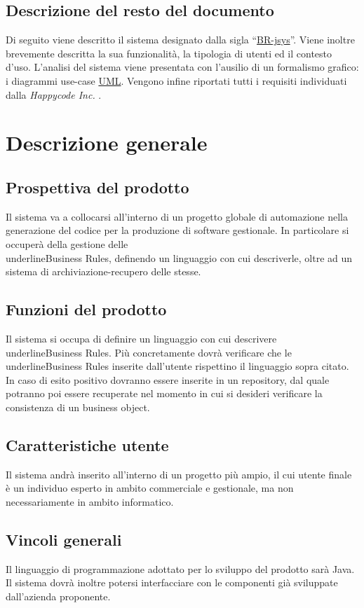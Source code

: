 \section{Descrizione del resto del documento}
Di seguito viene descritto il sistema designato dalla sigla ``\underline{BR-jsys}''. Viene inoltre brevemente descritta la sua funzionalit\`a, la tipologia di utenti ed il contesto d'uso. L'analisi del sistema viene presentata con l'ausilio di un formalismo grafico: i diagrammi use-case \underline{UML}. Vengono infine riportati tutti i requisiti individuati dalla \textit{Happycode Inc.} .

\chapter{Descrizione generale}
\section{Prospettiva del prodotto}
Il sistema va a collocarsi all'interno di un progetto globale di automazione nella generazione del codice per la produzione di software gestionale. In particolare si occuper\`a della gestione delle \\underline{Business Rules}, definendo un linguaggio con cui descriverle, oltre ad un sistema di archiviazione-recupero delle stesse.
\section{Funzioni del prodotto}
Il sistema si occupa di definire un linguaggio con cui descrivere \\underline{Business Rules}. Pi\`u concretamente dovr\`a verificare che le \\underline{Business Rules} inserite dall'utente rispettino il linguaggio sopra citato. In caso di esito positivo dovranno essere inserite in un repository, dal quale potranno poi essere recuperate nel momento in cui si desideri verificare la consistenza di un business object.
\section{Caratteristiche utente}
Il sistema andr\`a inserito all'interno di un progetto pi\`u ampio, il cui utente finale \`e un individuo esperto in ambito commerciale e gestionale, ma non necessariamente in ambito informatico.
\section{Vincoli generali}
Il linguaggio di programmazione adottato per lo sviluppo del prodotto sar\`a Java. Il sistema dovr\`a inoltre potersi interfacciare con le componenti gi\`a sviluppate dall'azienda proponente. 
